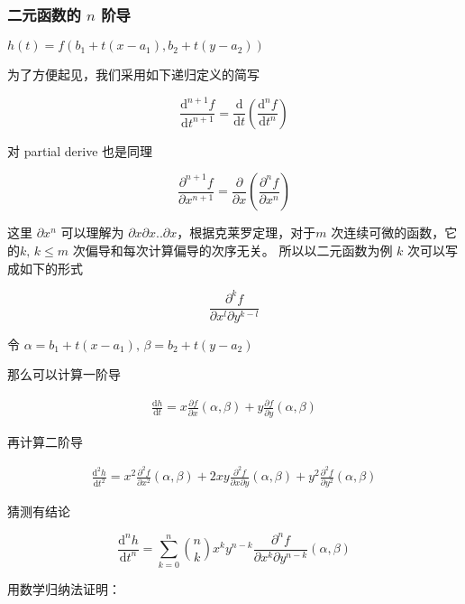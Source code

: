 \documentclass[12pt,a4paper]{ctexart}
\begin{document}
\subsubsection{二元函数的 $n$ 阶导}

$h(t) = f(b_1 + t(x-a_1), b_2 + t(y-a_2))$

为了方便起见，我们采用如下递归定义的简写

\[
\frac{\text{d}^{n+1} f}{\text{d}t^{n+1}} = \frac{\text{d}}{\text{d} t}\left( \frac{\text{d}^n f}{\text{d}t^n} \right)
\]

对 partial derive 也是同理

\[
\frac{\partial^{n+1} f}{\partial x^{n+1}} = \frac{\partial}{\partial x}\left( \frac{\partial^n f}{\partial x^n} \right)
\]

这里 $\partial x^n$ 可以理解为 $\partial x\partial x .. \partial x$，根据克莱罗定理，对于$m$ 次连续可微的函数，它的$k,\, k \le m$ 次偏导和每次计算偏导的次序无关。
所以以二元函数为例 $k$ 次可以写成如下的形式

\[
\frac{\partial^k f}{\partial x^{l} \partial y^{k-l}}
\]


令 $\alpha = b_1 + t(x-a_1),\, \beta = b_2 + t(y-a_2)$

那么可以计算一阶导

\begin{align*}
    \frac{\text{d} h}{\text{d} t} = x\frac{\partial f}{\partial x}(\alpha, \beta) + y \frac{\partial f}{\partial y}(\alpha, \beta)
\end{align*}

再计算二阶导

\begin{align*}
    \frac{\text{d}^2 h}{\text{d} t^2} = x^2\frac{\partial^2 f}{\partial x^2}(\alpha, \beta) + 2xy \frac{\partial^2 f}{\partial x \partial y}(\alpha, \beta) + y^2 \frac{\partial^2 f}{\partial y^2}(\alpha, \beta)
\end{align*}

猜测有结论

\[
\frac{\text{d}^n h}{\text{d} t^n} = \sum_{k=0}^{n} \binom{n}{k} x^{k}y^{n-k}\frac{\partial^n f}{\partial x^{k} \partial y^{n-k}}(\alpha, \beta)
\]

用数学归纳法证明：
\end{document}
